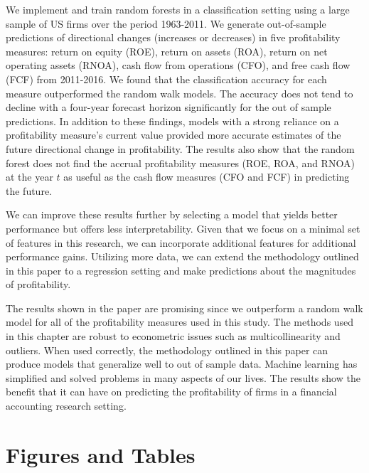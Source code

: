 We implement and train random forests in a classification setting using a large sample of US firms over the period 1963-2011.  We generate out-of-sample predictions of directional changes (increases or decreases) in five profitability measures: return on equity (ROE), return on assets (ROA), return on net operating assets (RNOA), cash flow from operations (CFO), and free cash flow (FCF) from 2011-2016. We found that the classification accuracy for each measure outperformed the random walk models.  The accuracy does not tend to decline with a four-year forecast horizon significantly for the out of sample predictions. In addition to these findings, models with a strong reliance on a profitability measure's current value provided more accurate estimates of the future directional change in profitability.   The results also show that the random forest does not find the accrual profitability measures (ROE,  ROA,  and RNOA) at the year \(t\) as useful as the cash flow measures (CFO and FCF) in predicting the future.

We can improve these results further by selecting a model that yields better performance but offers less interpretability. Given that we focus on a minimal set of features in this research, we can incorporate additional features for additional performance gains. Utilizing more data, we can extend the methodology outlined in this paper to a regression setting and make predictions about the magnitudes of profitability. 


The results shown in the paper are promising since  we outperform a random walk model for all of the profitability measures used in this study. The methods used in this chapter are robust to econometric issues such as multicollinearity and outliers.  When used correctly, the methodology outlined in this paper can produce models that generalize well to out of sample data.  Machine learning has simplified and solved problems in many aspects of our lives.  The results show the benefit that it can have on predicting the profitability of firms in a financial accounting research setting.

\clearpage

\section{Figures and Tables}


